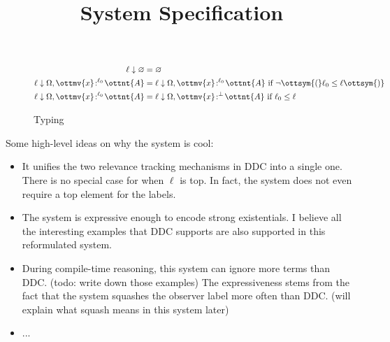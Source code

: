 \documentclass{article}
\title{System Specification}
\begin{document}

\begin{figure}[http]
  \centering
{}

  \begin{equation*}
    \begin{split}
       \ell  \downarrow  \varnothing  &=  \varnothing  \\
        \ell  \downarrow  \Omega  ,   \ottmv{x} \! :^{ \ell_{{\mathrm{0}}} }\! \ottnt{A}   &=   \ell  \downarrow  \Omega  ,   \ottmv{x} \! :^{ \ell_{{\mathrm{0}}} }\! \ottnt{A}   \text{ if }  \neg  \ottsym{(}  \ell_{{\mathrm{0}}}  \leq  \ell  \ottsym{)}  \\
        \ell  \downarrow  \Omega  ,   \ottmv{x} \! :^{ \ell_{{\mathrm{0}}} }\! \ottnt{A}   &=   \ell  \downarrow  \Omega  ,   \ottmv{x} \! :^{  { \color{black}{\bot} }  }\! \ottnt{A}   \text{ if } \ell_{{\mathrm{0}}}  \leq  \ell
    \end{split}
  \end{equation*}
  \caption{Typing}
  \label{fig:typing}
\end{figure}

Some high-level ideas on why the system is cool:
\begin{itemize}
\item It unifies the two relevance tracking mechanisms in DDC into a
  single one. There is no special case for when $\ell$ is top. In
  fact, the system does not even require a top element for the
  labels.
\item The system is expressive enough to encode strong
  existentials. I believe all the interesting examples that DDC
  supports are also supported in this reformulated system.
\item During compile-time reasoning, this system can ignore more terms
  than DDC. (todo: write down those examples) The expressiveness stems
  from the fact that the system squashes the observer label more often
  than DDC. (will explain what squash means in this system later)
\item ...
\end{itemize}
\end{document}
